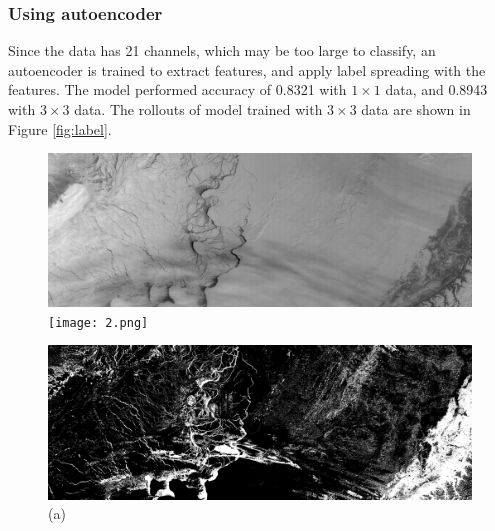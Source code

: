 \documentclass{article}
\begin{document}
        \subsubsection{Using autoencoder} \label{sec:aecomb}
            Since the data has 21 channels,
            which may be too large to classify,
            an autoencoder is trained to extract features,
            and apply label spreading with the features.
            The model performed accuracy of 0.8321 with $1\times 1$ data,
            and 0.8943 with $3\times 3$ data.
            The rollouts of model trained with $3\times 3$ data
            are shown in Figure \ref{fig:label}.

            \begin{figure}[ht]
                \centering
                \begin{minipage}{0.49\hsize}
                    \centering
                    \includegraphics[width = 1\hsize]{1.png}
                    \texttt{[image: 2.png]}
                    \caption*{(a)}
                \end{minipage}
                \begin{minipage}{0.49\hsize}
                    \centering
                    \includegraphics[width = 1\hsize]{1_label.png}

\end{minipage}
\end{figure}
\end{document}
